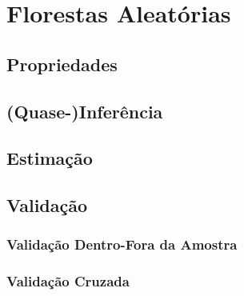 

\chapter{Florestas Aleatórias}

\section{Propriedades}

\section{(Quase-)Inferência}

\section{Estimação}


\section{Validação}
\subsection{Validação Dentro-Fora da Amostra}
\subsection{Validação Cruzada}